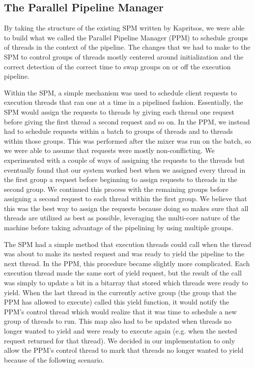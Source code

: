 \documentclass[11pt, oneside]{report}
\begin{document}
\subsection{The Parallel Pipeline Manager}

By taking the structure of the existing SPM written by Kapritsos, we were able to build what we called the Parallel Pipeline Manager (PPM) to schedule groups of threads in the context of the pipeline. The changes that we had to make to the SPM to control groups of threads mostly centered around initialization and the correct detection of the correct time to swap groups on or off the execution pipeline.

Within the SPM, a simple mechanism was used to schedule client requests to execution threads that ran one at a time in a pipelined fashion. Essentially, the SPM would assign the requests to threads by giving each thread one request before giving the first thread a second request and so on. In the PPM, we instead had to schedule requests within a batch to groups of threads and to threads within those groups. This was performed after the mixer was run on the batch, so we were able to assume that requests were mostly non-conflicting. We experimented with a couple of ways of assigning the requests to the threads but eventually found that our system worked best when we assigned every thread in the first group a request before beginning to assign requests to threads in the second group. We continued this process with the remaining groups before assigning a second request to each thread within the first group. We believe that this was the best way to assign the requests because doing so makes sure that all threads are utilized as best as possible, leveraging the multi-core nature of the machine before taking advantage of the pipelining by using multiple groups.

The SPM had a simple method that execution threads could call when the thread was about to make its nested request and was ready to yield the pipeline to the next thread. In the PPM, this procedure became slightly more complicated. Each execution thread made the same sort of yield request, but the result of the call was simply to update a bit in a bitarray that stored which threads were ready to yield. When the last thread in the currently active group (the group that the PPM has allowed to execute) called this yield function, it would notify the PPM's control thread which would realize that it was time to schedule a new group of threads to run. This map also had to be updated when threads no longer wanted to yield and were ready to execute again (e.g. when the nested request returned for that thread). We decided in our implementation to only allow the PPM's control thread to mark that threads no longer wanted to yield because of the following scenario. 
\end{document}
